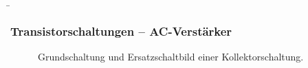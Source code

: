 \begin{frame}
    \b{
        \frametitle{Transistorschaltungen -- AC-Verstärker}
        \begin{figure}[H]
            \begin{minipage}[c]{0.48\textwidth}
                \raggedright
                \scalebox{1.2}{}
            \end{minipage}
            \begin{minipage}[c]{0.48\textwidth}
                \raggedleft
                \scalebox{0.8}{}
            \end{minipage}
            \caption{Grundschaltung und Ersatzschaltbild einer Kollektorschaltung.}
        \end{figure}

        \begin{itemize}
        \end{itemize}
    }
\end{frame}

